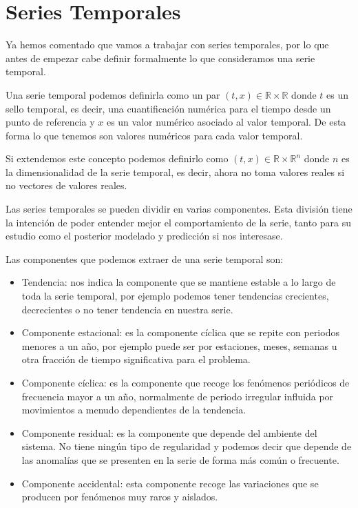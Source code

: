 \section{Series Temporales}

Ya hemos comentado que vamos a trabajar con series temporales, por lo que antes de empezar cabe definir formalmente lo que consideramos una serie temporal.

Una serie temporal podemos definirla como un par $(t,x)\in \mathbb{R}\times \mathbb{R}$ donde $t$ es un sello temporal, es decir, una cuantificación numérica para el tiempo desde un punto de referencia y $x$ es un valor numérico asociado al valor temporal. De esta forma lo que tenemos son valores numéricos para cada valor temporal.

Si extendemos este concepto podemos definirlo como $(t,x)\in \mathbb{R}\times \mathbb{R}^n$ donde $n$ es la dimensionalidad de la serie temporal, es decir, ahora no toma valores reales si no vectores de valores reales.

Las series temporales se pueden dividir en varias componentes. Esta división tiene la intención de poder entender mejor el comportamiento de la serie, tanto para su estudio como el posterior modelado y predicción si nos interesase.

Las componentes que podemos extraer de una serie temporal son:

\begin{itemize}
	\item Tendencia: nos indica la componente que se mantiene estable a lo largo de toda la serie temporal, por ejemplo podemos tener tendencias crecientes, decrecientes o no tener tendencia en nuestra serie.
	\item Componente estacional: es la componente cíclica que se repite con periodos menores a un año, por ejemplo puede ser por estaciones, meses, semanas u otra fracción de tiempo significativa para el problema.
	\item Componente cíclica: es la componente que recoge los fenómenos periódicos de frecuencia mayor a un año, normalmente de periodo irregular influida por movimientos a menudo dependientes de la tendencia.
	\item Componente residual: es la componente que depende del ambiente del sistema. No tiene ningún tipo de regularidad y podemos decir que depende de las anomalías que se presenten en la serie de forma más común o frecuente.
	\item Componente accidental: esta componente recoge las variaciones que se producen por fenómenos muy raros y aislados.
\end{itemize}

